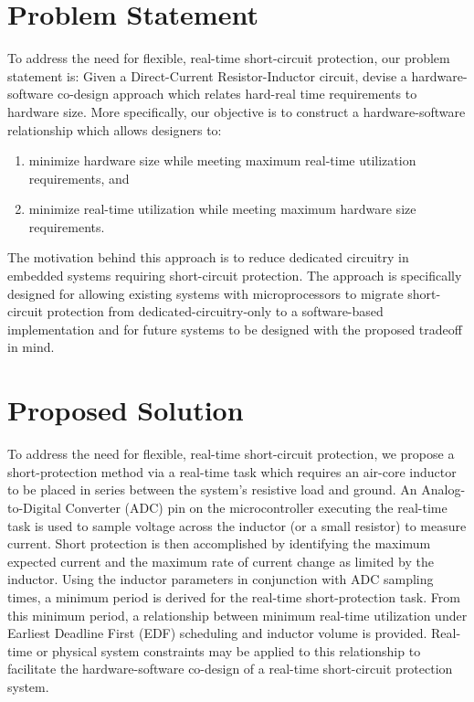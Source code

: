 \documentclass[11pt,compsoc,oneside]{report}
\begin{document}
\section{Problem Statement}
To address the need for flexible, real-time short-circuit protection, our problem statement is:
Given a Direct-Current Resistor-Inductor circuit, devise a hardware-software co-design approach which relates hard-real time requirements to hardware size. More specifically, our objective is to construct a hardware-software relationship which allows designers to:
\begin{enumerate}
    \item minimize hardware size while meeting maximum real-time utilization requirements, and
    \item minimize real-time utilization while meeting maximum hardware size requirements.
\end{enumerate}

The motivation behind this approach is to reduce dedicated circuitry in embedded systems requiring short-circuit protection. The approach is specifically designed for allowing existing systems with microprocessors to migrate short-circuit protection from dedicated-circuitry-only to a software-based implementation and for future systems to be designed with the proposed tradeoff in mind.

\section{Proposed Solution}
To address the need for flexible, real-time short-circuit protection, we propose a short-protection method via a real-time task which requires an air-core inductor to be placed in series between the system's resistive load and ground. An Analog-to-Digital Converter (ADC) pin on the microcontroller executing the real-time task is used to sample voltage across the inductor (or a small resistor) to measure current. Short protection is then accomplished by identifying the maximum expected current and the maximum rate of current change as limited by the inductor. Using the inductor parameters in conjunction with ADC sampling times, a minimum period is derived for the real-time short-protection task. From this minimum period, a relationship between minimum real-time utilization under Earliest Deadline First (EDF) scheduling and inductor volume is provided. Real-time or physical system constraints may be applied to this relationship to facilitate the hardware-software co-design of a real-time short-circuit protection system.
\end{document}

